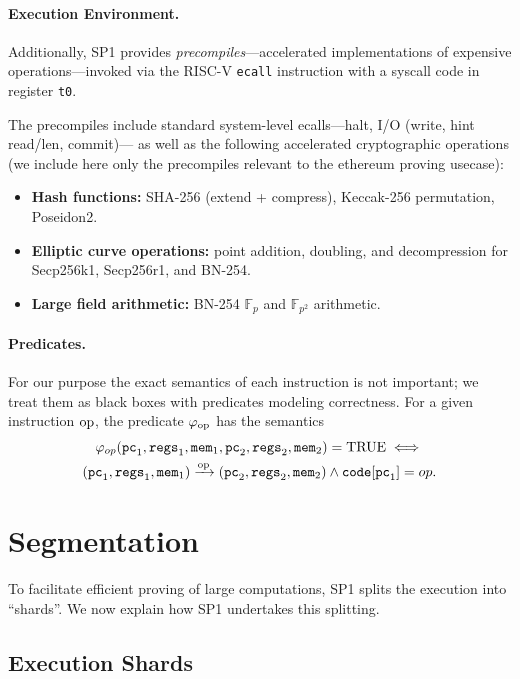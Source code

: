 \documentclass[11pt]{article}
\begin{document}
\paragraph{Execution Environment.}
Additionally, SP1 provides \emph{precompiles}---accelerated
implementations of expensive operations---invoked via the RISC-V
\texttt{ecall} instruction with a syscall code in register \texttt{t0}.

The precompiles include standard system-level ecalls---halt, I/O (write, hint read/len, commit)---
as well as the following accelerated cryptographic operations
(we include here only the precompiles relevant to the ethereum proving usecase):
\begin{itemize}
\item \textbf{Hash functions:} SHA-256 (extend + compress), Keccak-256
  permutation, Poseidon2.
\item \textbf{Elliptic curve operations:} point addition, doubling, and
  decompression for Secp256k1, Secp256r1, and BN-254.
\item \textbf{Large field arithmetic:} BN-254 $\mathbb{F}_p$ and $\mathbb{F}_{p^2}$ arithmetic.
\end{itemize}

\paragraph{Predicates.}
For our purpose the exact semantics of each instruction is not
important; we treat them as black boxes with predicates modeling
correctness.
For a given instruction $\mathrm{op}$, the predicate $\varphi_{\mathrm{op}}$ has the
semantics
\begin{multline}\label{eq:phiop}
\varphi_{op}(\mathtt{pc}_1,\mathtt{regs}_1,\mathtt{mem}_1,\mathtt{pc}_2,\mathtt{regs}_2,\mathtt{mem}_2)=\mathrm{TRUE} \;\Longleftrightarrow\;\\
 (\mathtt{pc}_1,\mathtt{regs}_1,\mathtt{mem}_1)\xrightarrow{\mathrm{op}} (\mathtt{pc}_2,\mathtt{regs}_2,\mathtt{mem}_2) \wedge \mathtt{code}[\mathtt{pc}_1]=op.
\end{multline}

\section{Segmentation}\label{sec:seg}
To facilitate efficient proving of large computations, SP1 splits the execution into ``shards''. We now explain how SP1 undertakes this splitting.

\subsection{Execution Shards}
\end{document}
